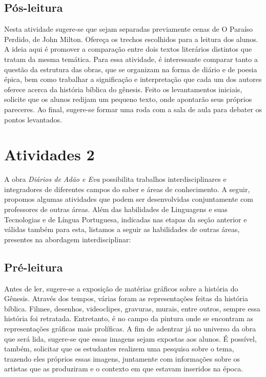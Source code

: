 \documentclass{extarticle}
\begin{document}
\subsection{Pós-leitura}


Nesta atividade sugere-se que sejam separadas previamente
cenas de O Paraíso Perdido, de John Milton. Ofereça os trechos
escolhidos para a leitura dos alunos. A ideia aqui é promover a
comparação entre dois textos literários distintos que tratam da mesma
temática. Para essa atividade, é interessante comparar tanto a questão
da estrutura das obras, que se organizam na forma de diário e de poesia
épica, bem como trabalhar a significação e interpretação que cada um dos
autores oferece acerca da história bíblica do gênesis. Feito os
levantamentos iniciais, solicite que os alunos redijam um pequeno texto,
onde apontarão seus próprios pareceres. Ao final, sugere-se formar uma
roda com a sala de aula para debater os pontos levantados.


\section{Atividades 2}


A obra \emph{Diários de Adão e Eva} possibilita trabalhos
interdisciplinares e integradores de diferentes campos do saber e áreas
de conhecimento. A seguir, propomos algumas atividades que podem ser
desenvolvidas conjuntamente com professores de outras áreas. Além das
habilidades de Linguagens e suas Tecnologias e de Língua Portuguesa,
indicadas nas etapas da seção anterior e válidas também para esta,
listamos a seguir as habilidades de outras áreas, presentes na abordagem
interdisciplinar:

\subsection{Pré-leitura}

Antes de ler, sugere-se a exposição de matérias gráficos
sobre a história do Gênesis. Através dos tempos, várias foram as
representações feitas da história bíblica. Filmes, desenhos,
videoclipes, gravuras, murais, entre outros, sempre essa história foi
retratada. Entretanto, é no campo da pintura onde se encontram as
representações gráficas mais prolíficas. A fim de adentrar já no
universo da obra que será lida, sugere-se que essas imagens sejam
expostas aos alunos. É possível, também, solicitar que os estudantes
realizem uma pesquisa sobre o tema, trazendo eles próprios essas
imagens, juntamente com informações sobre os artistas que as produziram
e o contexto em que estavam inseridos na época.
\end{document}
